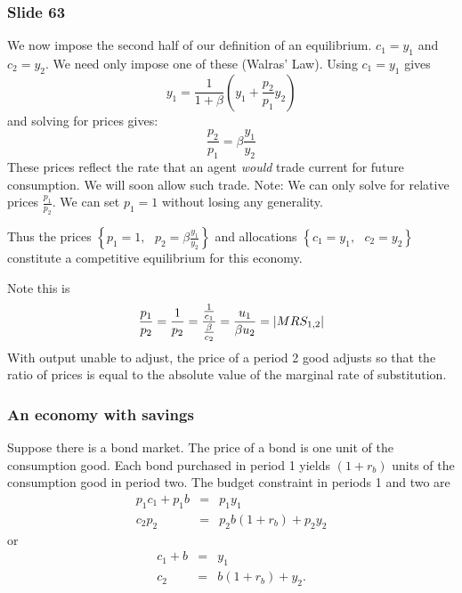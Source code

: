\documentclass[aspectratio=169]{ltx-talk}
\begin{document}
\begin{frame}
\frametitle{Slide 63}
We now impose the second half of our definition of an equilibrium. $%
c_{1}=y_{1}$ and $c_{2}=y_{2}$. We need only impose one of these (Walras'
Law). Using $c_{1}=y_{1}$ gives 
\begin{equation*}
y_{1}=\frac{1}{1+\beta }\left( y_{1}+\frac{p_{2}}{p_{1}}y_{2}\right)
\end{equation*}%
and solving for prices gives:%
\begin{equation*}
\frac{p_{2}}{p_{1}}=\beta \frac{y_{1}}{y_{2}}
\end{equation*}%
These prices reflect the rate that an agent \textit{would} trade current for
future consumption. We will soon allow such trade. Note: We can only solve
for relative prices $\frac{p_{1}}{p_{2}}$. We can set $p_{1}=1$ without
losing any generality.

Thus the prices $\left\{ p_{1}=1,\text{ }p_{2}=\beta \frac{y_{1}}{y_{2}}%
\right\} $ and allocations $\left\{ c_{1}=y_{1},\text{ }c_{2}=y_{2}\right\} $
constitute a competitive equilibrium for this economy.

Note this is 
\begin{equation*}
\frac{p_{1}}{p_{2}}=\frac{1}{p_{2}}=\frac{\frac{1}{c_{1}}}{\frac{\beta }{%
c_{2}}}=\frac{u_{1}}{\beta u_{2}}=\left\vert MRS_{1,2}\right\vert
\end{equation*}%
With output unable to adjust, the price of a period 2 good adjusts so that
the ratio of prices is equal to the absolute value of the marginal rate of
substitution.
\end{frame}

\begin{frame}
\frametitle{An economy with savings}
Suppose there is a bond market. The price of a bond is one unit of the
consumption good. Each bond purchased in period 1 yields $\left(
1+r_{b}\right) $ units of the consumption good in period two. The budget
constraint in periods 1 and two are%
\begin{eqnarray*}
p_{1}c_{1}+p_{1}b &=&p_{1}y_{1} \\
c_{2}p_{2} &=&p_{2}b\left( 1+r_{b}\right) +p_{2}y_{2}
\end{eqnarray*}%
or%
\begin{eqnarray*}
c_{1}+b &=&y_{1} \\
c_{2} &=&b\left( 1+r_{b}\right) +y_{2}.
\end{eqnarray*}%
\end{frame}
\end{document}

